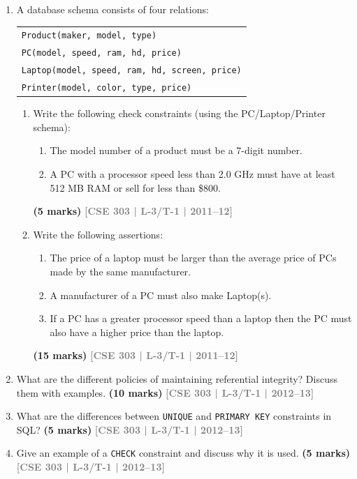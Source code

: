 \documentclass[12pt,a3paper]{article}
\newcommand{\yr}[1]{\hfill\textcolor{gray}{\small\textbf{[#1]}}}
\newcommand{\mk}[1]{\textcolor{orange!70!black}{\small\textbf{(#1 marks)}}}
\begin{document}
\begin{enumerate}

\item A database schema consists of four relations:
\begin{center}
\begin{tabular}{l}
\texttt{Product(maker, model, type)}\\
\texttt{PC(model, speed, ram, hd, price)}\\
\texttt{Laptop(model, speed, ram, hd, screen, price)}\\
\texttt{Printer(model, color, type, price)}
\end{tabular}
\end{center}
\begin{enumerate}
\item Write the following check constraints (using the PC/Laptop/Printer schema):
\begin{enumerate}
  \item The model number of a product must be a 7-digit number.
  \item A PC with a processor speed less than 2.0 GHz must have at least 512 MB RAM or sell for less than \$800.
\end{enumerate}
\mk{5} \yr{CSE 303 | L-3/T-1 | 2011--12}

\item Write the following assertions:
\begin{enumerate}
  \item The price of a laptop must be larger than the average price of PCs made by the same manufacturer.
  \item A manufacturer of a PC must also make Laptop(s).
  \item If a PC has a greater processor speed than a laptop then the PC must also have a higher price than the laptop.
\end{enumerate}
\mk{15} \yr{CSE 303 | L-3/T-1 | 2011--12}
\end{enumerate}

\item What are the different policies of maintaining referential integrity? Discuss them with examples.
\mk{10} \yr{CSE 303 | L-3/T-1 | 2012--13}

\item What are the differences between \texttt{UNIQUE} and \texttt{PRIMARY KEY} constraints in SQL?
\mk{5} \yr{CSE 303 | L-3/T-1 | 2012--13}

\item Give an example of a \texttt{CHECK} constraint and discuss why it is used.
\mk{5} \yr{CSE 303 | L-3/T-1 | 2012--13}


\end{enumerate}
\end{document}
